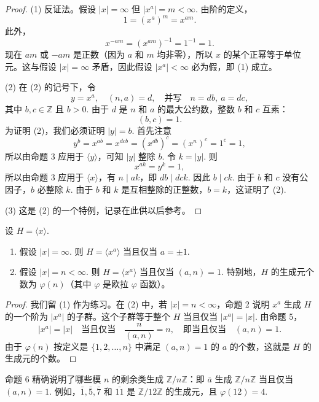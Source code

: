 \begin{proof}
(1) 反证法。假设 \(|x| = \infty\) 但 \(|x^a| = m < \infty\). 由阶的定义，
\[
1 = (x^a)^m = x^{am}.
\]
此外，
\[
x^{-am} = (x^{am})^{-1} = 1^{-1} = 1.
\]
现在 \(am\) 或 \(-am\) 是正数（因为 \(a\) 和 \(m\) 均非零），所以 \(x\) 的某个正幂等于单位元。这与假设 \(|x| = \infty\) 矛盾，因此假设 \(|x^a| < \infty\) 必为假，即 (1) 成立。

(2) 在 (2) 的记号下，令
\[
y = x^a,\quad (n, a) = d,\quad \text{并写}\quad n = db,\ a = dc,
\]
其中 \(b, c \in \mathbb{Z}\) 且 \(b > 0\). 由于 \(d\) 是 \(n\) 和 \(a\) 的最大公约数，整数 \(b\) 和 \(c\) 互素：
\[
(b, c) = 1.
\]
为证明 (2)，我们必须证明 \(|y| = b\). 首先注意
\[
y^b = x^{ab} = x^{dcb} = (x^{db})^c = (x^n)^c = 1^c = 1,
\]
所以由命题 3 应用于 \(\langle y \rangle\)，可知 \(|y|\) 整除 \(b\). 令 \(k = |y|\). 则
\[
x^{ak} = y^k = 1,
\]
所以由命题 3 应用于 \(\langle x \rangle\)，有 \(n \mid ak\)，即 \(db \mid dck\). 因此 \(b \mid ck\). 由于 \(b\) 和 \(c\) 没有公因子，\(b\) 必整除 \(k\). 由于 \(b\) 和 \(k\) 是互相整除的正整数，\(b = k\)，这证明了 (2).

(3) 这是 (2) 的一个特例，记录在此供以后参考。
\end{proof}

\begin{proposition}
设 \(H = \langle x \rangle\).
\begin{enumerate}[label=(\arabic*)]
\item 假设 \(|x| = \infty\). 则 \(H = \langle x^a \rangle\) 当且仅当 \(a = \pm 1\).
\item 假设 \(|x| = n < \infty\). 则 \(H = \langle x^a \rangle\) 当且仅当 \((a, n) = 1\). 特别地，\(H\) 的生成元个数为 \(\varphi(n)\)（其中 \(\varphi\) 是欧拉 \(\varphi\) 函数）。
\end{enumerate}
\end{proposition}

\begin{proof}
我们留 (1) 作为练习。在 (2) 中，若 \(|x| = n < \infty\)，命题 2 说明 \(x^a\) 生成 \(H\) 的一个阶为 \(|x^a|\) 的子群。这个子群等于整个 \(H\) 当且仅当 \(|x^a| = |x|\). 由命题 5，
\[
|x^a| = |x| \quad \text{当且仅当} \quad \frac{n}{(a, n)} = n,\quad \text{即当且仅当} \quad (a, n) = 1.
\]
由于 \(\varphi(n)\) 按定义是 \(\{1, 2, \ldots, n\}\) 中满足 \((a, n) = 1\) 的 \(a\) 的个数，这就是 \(H\) 的生成元的个数。
\end{proof}

\begin{example}
命题 6 精确说明了哪些模 \(n\) 的剩余类生成 \(\mathbb{Z}/n\mathbb{Z}\)：即 \(\bar{a}\) 生成 \(\mathbb{Z}/n\mathbb{Z}\) 当且仅当 \((a, n) = 1\). 例如，\(\bar{1}, \bar{5}, \bar{7}\) 和 \(\bar{11}\) 是 \(\mathbb{Z}/12\mathbb{Z}\) 的生成元，且 \(\varphi(12) = 4\).
\end{example}

